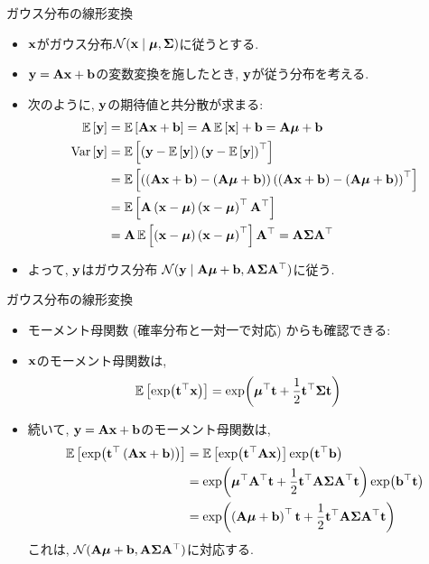\documentclass[dvipdfmx,notheorems,t]{beamer}
\begin{document}
\begin{frame}{ガウス分布の線形変換}
\begin{itemize}
  \item $\vb{x}$がガウス分布$\mathcal{N}(\vb{x} \mid \vb*{\mu}, \vb{\Sigma})$に従うとする.
  \item $\vb{y} = \vb{A} \vb{x} + \vb{b}$の変数変換を施したとき, $\vb{y}$が従う分布を考える.
  \item 次のように, $\vb{y}$の期待値と共分散が求まる:
  \begin{align*}
    \operatorname{\mathbb{E}} \left[ \vb{y} \right] &= \operatorname{\mathbb{E}} \left[ \vb{A} \vb{x} + \vb{b} \right] = \vb{A} \operatorname{\mathbb{E}} \left[ \vb{x} \right] + \vb{b}
      = \vb{A} \vb*{\mu} + \vb{b} \\
    \operatorname{Var} \left[ \vb{y} \right] &= \operatorname{\mathbb{E}} \left[ \left( \vb{y} - \operatorname{\mathbb{E}} \left[ \vb{y} \right] \right) \left( \vb{y} - \operatorname{\mathbb{E}} \left[ \vb{y} \right] \right)^\top \right] \\
    &= \operatorname{\mathbb{E}} \left[ \left( \left( \vb{A} \vb{x} + \vb{b} \right) - \left( \vb{A} \vb*{\mu} + \vb{b} \right) \right)
      \left( \left( \vb{A} \vb{x} + \vb{b} \right) - \left( \vb{A} \vb*{\mu} + \vb{b} \right) \right)^\top \right] \\
    &= \operatorname{\mathbb{E}} \left[ \vb{A} \left( \vb{x} - \vb*{\mu} \right) \left( \vb{x} - \vb*{\mu} \right)^\top \vb{A}^\top \right] \\
    &= \vb{A} \operatorname{\mathbb{E}} \left[ \left( \vb{x} - \vb*{\mu} \right) \left( \vb{x} - \vb*{\mu} \right)^\top \right] \vb{A}^\top
    = \vb{A} \vb{\Sigma} \vb{A}^\top
  \end{align*}
  \item よって, $\vb{y}$はガウス分布
  $\mathcal{N}(\vb{y} \mid \vb{A} \vb*{\mu} + \vb{b}, \vb{A} \vb{\Sigma} \vb{A}^\top)$に従う.
\end{itemize}
\end{frame}

\begin{frame}{ガウス分布の線形変換}
\begin{itemize}
  \item モーメント母関数 (確率分布と一対一で対応) からも確認できる:
  \item $\vb{x}$のモーメント母関数は,
  \begin{align*}
    \operatorname{\mathbb{E}} \left[ \exp(\vb{t}^\top \vb{x}) \right]
    &= \exp(\vb*{\mu}^\top \vb{t} + \frac{1}{2} \vb{t}^\top \vb{\Sigma} \vb{t})
  \end{align*}
  \item 続いて, $\vb{y} = \vb{A} \vb{x} + \vb{b}$のモーメント母関数は,
  \begin{align*}
    \operatorname{\mathbb{E}} \left[ \exp(\vb{t}^\top \left( \vb{A} \vb{x} + \vb{b} \right)) \right]
    &= \operatorname{\mathbb{E}} \left[ \exp(\vb{t}^\top \vb{A} \vb{x}) \right] \exp(\vb{t}^\top \vb{b}) \\
    &= \exp(\vb*{\mu}^\top \vb{A}^\top \vb{t}
      + \frac{1}{2} \vb{t}^\top \vb{A} \vb{\Sigma} \vb{A}^\top \vb{t})
      \exp(\vb{b}^\top \vb{t}) \\
    &= \exp(\left( \vb{A} \vb*{\mu} + \vb{b} \right)^\top \vb{t}
      + \frac{1}{2} \vb{t}^\top \vb{A} \vb{\Sigma} \vb{A}^\top \vb{t})
  \end{align*}
  これは, $\mathcal{N}(\vb{A} \vb*{\mu} + \vb{b}, \vb{A} \vb{\Sigma} \vb{A}^\top)$に対応する.
\end{itemize}
\end{frame}
\end{document}
